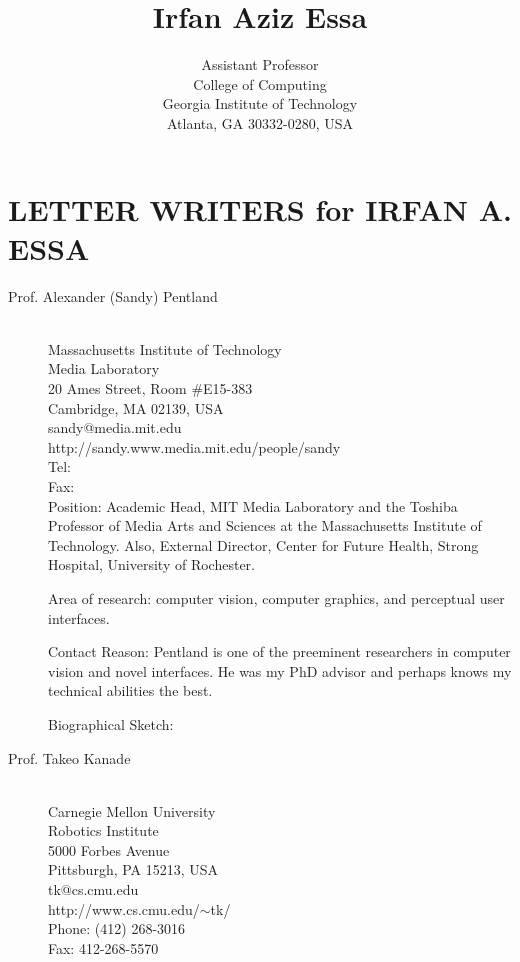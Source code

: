 \documentclass{gtcv}
\title{\vspace{-1.0in}Irfan Aziz Essa}
\author{Assistant Professor \\ College of Computing \\ Georgia Institute of Technology \\
Atlanta, GA  30332-0280, USA}
\date{}
\begin{document}
\maketitle

\setlength{\parskip}{1pt}
\section*{LETTER WRITERS for IRFAN A. ESSA}

\begin{description}

\item[Prof. Alexander (Sandy) Pentland]~\\
Massachusetts Institute of Technology\\
Media Laboratory\\
20 Ames Street, Room \#E15-383\\
Cambridge, MA 02139, USA\\
sandy@media.mit.edu\\
http://sandy.www.media.mit.edu/people/sandy\\
Tel:\\
Fax:\\

\medskip
Position:  Academic Head, MIT Media Laboratory and the Toshiba
Professor of Media Arts and Sciences at the Massachusetts
Institute of Technology. Also, External Director, Center for
Future Health, Strong Hospital, University of Rochester.

Area of research: computer vision, computer graphics, and
perceptual user interfaces.

Contact Reason:  Pentland is one of the preeminent researchers in
computer vision and novel interfaces.  He was my PhD advisor and
perhaps knows my technical abilities the best.

\smallskip
Biographical Sketch:

\item[Prof. Takeo Kanade]~\\
Carnegie Mellon University \\
Robotics Institute \\
5000 Forbes Avenue \\
Pittsburgh, PA 15213, USA\\
tk@cs.cmu.edu  \\
http://www.cs.cmu.edu/$\sim$tk/\\
Phone: (412) 268-3016 \\
Fax: 412-268-5570


\end{description}
\end{document}
